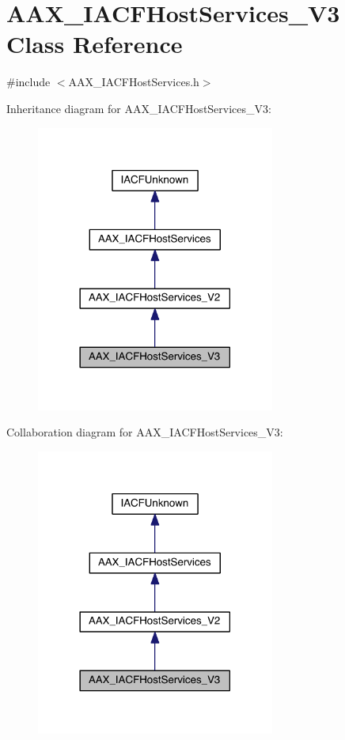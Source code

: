 \hypertarget{a00073}{}\section{A\+A\+X\+\_\+\+I\+A\+C\+F\+Host\+Services\+\_\+\+V3 Class Reference}
\label{a00073}


{\ttfamily \#include $<$A\+A\+X\+\_\+\+I\+A\+C\+F\+Host\+Services.\+h$>$}



Inheritance diagram for A\+A\+X\+\_\+\+I\+A\+C\+F\+Host\+Services\+\_\+\+V3\+:
\nopagebreak
\begin{figure}[H]
\begin{center}
\leavevmode
\includegraphics[width=222pt]{a00562}
\end{center}
\end{figure}


Collaboration diagram for A\+A\+X\+\_\+\+I\+A\+C\+F\+Host\+Services\+\_\+\+V3\+:
\nopagebreak
\begin{figure}[H]
\begin{center}
\leavevmode
\includegraphics[width=222pt]{a00563}
\end{center}
\end{figure}


